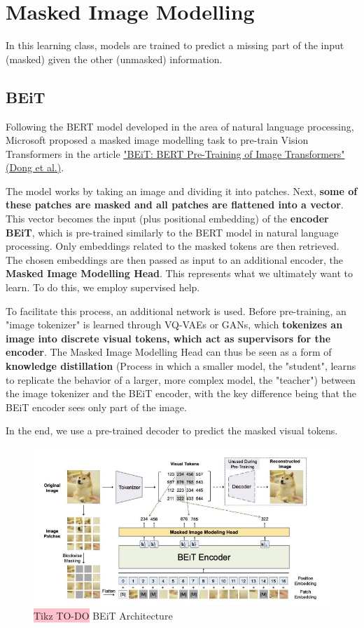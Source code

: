 \section{Masked Image Modelling}

In this learning class, models are trained to predict a missing part of the input (masked) given the other (unmasked) information.

\subsection{BEiT}

Following the BERT model developed in the area of natural language processing, Microsoft proposed a masked image modelling task to pre-train Vision Transformers in the article \href{https://arxiv.org/pdf/2106.08254}{"BEiT: BERT Pre-Training of Image Transformers" (Dong et al.)}.

The model works by taking an image and dividing it into patches. Next, \textbf{some of these patches are masked and all patches are flattened into a vector}. This vector becomes the input (plus positional embedding) of the \textbf{encoder BEiT}, which is pre-trained similarly to the BERT model in natural language processing. Only embeddings related to the masked tokens are then retrieved. The chosen embeddings are then passed as input to an additional encoder, the \textbf{Masked Image Modelling Head}. This represents what we ultimately want to learn. To do this, we employ supervised help.

To facilitate this process, an additional network is used. Before pre-training, an "image tokenizer" is learned through VQ-VAEs or GANs, which \textbf{tokenizes an image into discrete visual tokens, which act as supervisors for the encoder}. The Masked Image Modelling Head can thus be seen as a form of \textbf{knowledge distillation} (Process in which a smaller model, the "student", learns to replicate the behavior of a larger, more complex model, the "teacher") between the image tokenizer and the BEiT encoder, with the key difference being that the BEiT encoder sees only part of the image.

In the end, we use a pre-trained decoder to predict the masked visual tokens.

\begin{figure}[!htbp]
    \centering
    \includegraphics[width=\linewidth]{tikz/chapter11 - BEiT.png}
    \caption{{\color{red}\colorbox{pink}{Tikz TO-DO}} BEiT Architecture}
\end{figure}

